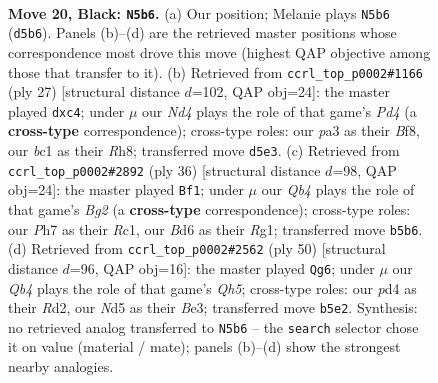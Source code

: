\documentclass[11pt]{article}
\begin{document}
\clearpage

\begin{figure}[p]\centering
\begin{subfigure}{0.46\textwidth}\centering
\resizebox{\linewidth}{!}{%
\newchessgame
\chessboard[
  setfen={r6r/p2nk2p/2pbp1p1/1q1n2P1/Np1P3N/P3P2P/1P6/R1BQ1RK1 b - - 0 20},
  showmover=false,
  pgfstyle=straightmove, color=movearrow, markmove={d5-b6}
]}
\caption{}
\end{subfigure}\hfill
\begin{subfigure}{0.46\textwidth}\centering
\resizebox{\linewidth}{!}{%
\newchessgame
\chessboard[
  setfen={r3kb1r/pp1nn3/2p1pp2/3p3p/2PP3P/2NQB1N1/Pq3PP1/2R1K2R b Kkq - 0 14},
  showmover=false,
  pgfstyle=straightmove, color=movearrow, markmove={d5-c4}
]}
\caption{}
\end{subfigure}
\\[4pt]
\begin{subfigure}{0.46\textwidth}\centering
\resizebox{\linewidth}{!}{%
\newchessgame
\chessboard[
  setfen={r1b3rk/1p1nq3/2p1p3/p2n1pp1/3P4/1QN1P3/PP1N1PBP/2R3RK w - - 0 19},
  showmover=false,
  pgfstyle=straightmove, color=movearrow, markmove={g2-f1}
]}
\caption{}
\end{subfigure}\hfill
\begin{subfigure}{0.46\textwidth}\centering
\resizebox{\linewidth}{!}{%
\newchessgame
\chessboard[
  setfen={2q1r1k1/pp3rp1/2n4p/P1pN3Q/2P1pPb1/2P1B3/3R2PP/R5K1 w - - 2 26},
  showmover=false,
  pgfstyle=straightmove, color=movearrow, markmove={h5-g6}
]}
\caption{}
\end{subfigure}
\caption{\textbf{Move 20, Black: \texttt{N5b6}.} (a) Our position; Melanie plays \texttt{N5b6} (\texttt{d5b6}). Panels (b)--(d) are the retrieved master positions whose correspondence most drove this move (highest QAP objective among those that transfer to it). (b) Retrieved from \texttt{ccrl\_top\_p0002\#1166} (ply 27) [structural distance $d$=102, QAP obj=24]: the master played \texttt{dxc4}; under $\mu$ our \emph{Nd4} plays the role of that game's \emph{Pd4} (a \textbf{cross-type} correspondence); cross-type roles: our \emph{p}a3 as their \emph{B}f8, our \emph{b}c1 as their \emph{R}h8; transferred move \texttt{d5e3}. (c) Retrieved from \texttt{ccrl\_top\_p0002\#2892} (ply 36) [structural distance $d$=98, QAP obj=24]: the master played \texttt{Bf1}; under $\mu$ our \emph{Qb4} plays the role of that game's \emph{Bg2} (a \textbf{cross-type} correspondence); cross-type roles: our \emph{P}h7 as their \emph{R}c1, our \emph{B}d6 as their \emph{R}g1; transferred move \texttt{b5b6}. (d) Retrieved from \texttt{ccrl\_top\_p0002\#2562} (ply 50) [structural distance $d$=96, QAP obj=16]: the master played \texttt{Qg6}; under $\mu$ our \emph{Qb4} plays the role of that game's \emph{Qh5}; cross-type roles: our \emph{p}d4 as their \emph{R}d2, our \emph{N}d5 as their \emph{B}e3; transferred move \texttt{b5e2}. Synthesis: no retrieved analog transferred to \texttt{N5b6} -- the \texttt{search} selector chose it on value (material / mate); panels (b)--(d) show the strongest nearby analogies.}
\label{fig:thought-m39}
\end{figure}
\end{document}
